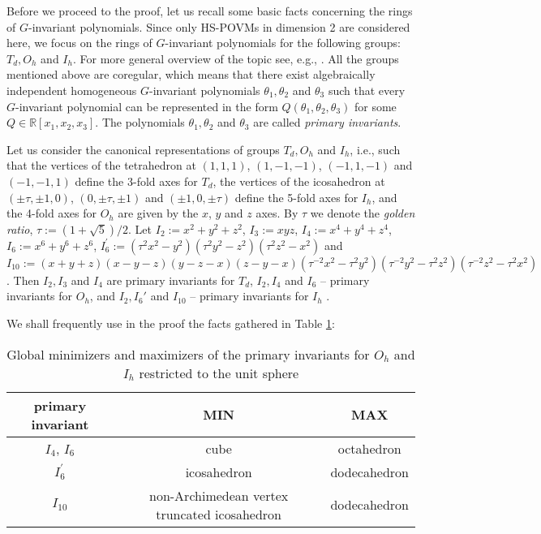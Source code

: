 \documentclass[11pt]{article}
\theoremstyle{remark}
\theoremstyle{definition}
\begin{document}
Before we proceed to the proof, let us recall some basic facts concerning the rings of $G$-invariant polynomials. 
Since  only HS-POVMs in dimension 2 are considered here, we focus on the rings of $G$-invariant polynomials for the following groups: $T_d,O_h$ and $I_h$. For more general overview of the topic see, e.g., \cite{DerKem02,Jaretal84}. 
All the groups mentioned above are coregular, which means that there exist algebraically independent homogeneous $G$-invariant polynomials $\theta_1,\theta_2$ and $\theta_3$ such that every $G$-invariant polynomial can be represented in the form $Q(\theta_1,\theta_2,\theta_3)$ for some $Q\in\mathbb R[x_1,x_2,x_3]$. The polynomials $\theta_1,\theta_2$ and $\theta_3$ are called \emph{primary invariants}. 

Let us consider the canonical representations of groups $T_d, O_h$ and $I_h$, i.e., such that the vertices of the tetrahedron at $(1,1,1)$, $(1,-1,-1)$, $(-1,1,-1)$ and $(-1,-1,1)$ define the 3-fold axes for $T_d$, the vertices of the icosahedron at $(\pm\tau,\pm 1,0)$, $(0,\pm\tau,\pm 1)$ and $(\pm 1,0,\pm\tau)$ define the 5-fold axes for $I_h$, and the 4-fold axes for $O_h$ are given by the $x$, $y$ and $z$ axes. By $\tau$ we denote the \emph{golden ratio}, $\tau:=(1+\sqrt{5})/2$.  Let $I_{2}:=x^{2}+y^{2}+z^{2}$, $I_{3}:=xyz$,
$I_{4}:=x^{4}+y^{4}+z^{4}$, $I_{6}:=x^{6}+y^{6}+z^{6}$, $I_{6}^{\prime}
:=(\tau^{2}x^{2}-y^{2})(\tau^{2}y^{2}-z^{2})(\tau^{2}z^{2}-x^{2})$ and
$I_{10}:=(x+y+z)(x-y-z)(y-z-x) (z-y-x)(\tau^{-2}x^{2}-\tau^{2}y^{2})(\tau
^{-2}y^{2}-\tau^{2}z^{2})(\tau^{-2}z^{2}-\tau^{2}x^{2})$. Then $I_2,I_3$ and $I_4$ are primary invariants for $T_d$, $I_2, I_4$ and $I_6$ -- primary invariants for $O_h$, and $I_2, I_6'$ and $I_{10}$ -- primary invariants for $I_h$ \cite{Jaretal84}. 

We shall frequently use in the proof the facts gathered in Table \ref{priminv}:
\begin{table}[ht]\label{priminv}
	\begin{small}
		\centering
		\begin{tabular}
			[c]{c|c|c}%
			primary invariant & MIN & MAX\\\hline \hline
			$I_{4}$, $I_6$ & cube & octahedron \\\hline
			$I_{6}^{\prime}$ & icosahedron & dodecahedron \\\hline
			$I_{10}$ &non-Archimedean vertex
			truncated icosahedron & dodecahedron 
		\end{tabular}
		
		\caption{Global minimizers and maximizers of the primary invariants for $O_h$ and $I_h$ restricted to the unit sphere}\label{priminv}
	\end{small}
\end{table}
\end{document}
